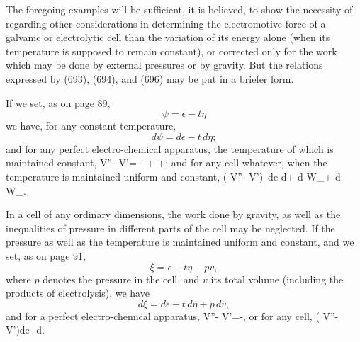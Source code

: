 \documentclass[12pt]{article}
\begin{document}
The foregoing examples will be sufficient, it is believed, to show the necessity of regarding other considerations in determining the electromotive force of a galvanic or electrolytic cell than the variation of its energy alone (when its temperature is supposed to remain constant), or corrected only for the work which may be done by external pressures or by gravity. But the relations expressed by (693), (694), and (696) may be put in a briefer form.

If we set, as on page 89,
$$ \psi = \epsilon -t\eta $$
we have, for any constant temperature,
$$ d\psi = d\epsilon - t \, d\eta ;$$
and for any perfect electro-chemical apparatus, the temperature of which is maintained constant,
\eqs V''- V'= - +  +; \label{697} \eqe
and for any cell whatever, when the temperature is maintained uniform and constant,
\eqs ( V''- V')\, de \leq d\psi + d W_+ d W_.  \label{698} \eqe

In a cell of any ordinary dimensions, the work done by gravity, as well as the inequalities of pressure in different parts of the cell may be neglected. If the pressure as well as the temperature is maintained uniform and constant, and we set, as on page 91,
$$ \xi=\epsilon-t\eta +pv,$$
where $p$ denotes the pressure in the cell, and $v$ its total volume (including the products of electrolysis), we have
$$ d\xi=d\epsilon-t\,d\eta +p\, dv,$$
and for a perfect electro-chemical apparatus,
\eqs V''- V'=-,   \label{699} \eqe
or for any cell,
\eqs ( V''- V')de \leq -d\xi.    \label{700} \eqe
\end{document}
